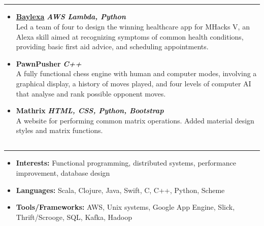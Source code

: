 \documentclass[7pt,letterpaper]{article}
\begin{document}
\subsection*{}
\hrule
\vspace{1.0em}
  \begin{itemize}
    \parskip=-0.5em
  \itemsep0.6em

    \item[]
      {\href{http://devpost.com/software/baylexa-fv149r}{\textbf{Baylexa}}}
      \hfill \textbf{\emph{AWS Lambda, Python}}
      \\
      Led a team of four to design the winning healthcare app for MHacks V, an
      Alexa skill aimed at recognizing symptoms of common health conditions,
      providing basic first aid advice, and scheduling appointments.
    \item[]
      \textbf{PawnPusher} \hfill \textbf{\emph{C++}}
      \\
      A fully functional chess engine with human and computer modes, involving a
      graphical display, a history of moves played, and four levels of computer
      AI that analyse and rank possible opponent moves.
    \item[]
      \textbf{Mathrix} \hfill \textbf{\emph{HTML, CSS, Python, Bootstrap}}
      \\
      A website for performing common matrix operations. Added material design
      styles and matrix functions.
  \end{itemize}

 
\subsection*{}
\hrule
\vspace{1.0em}
  \begin{itemize}
    \parskip=-0.5em
  \itemsep0.5em

    \item[]
      \textbf{Interests:} Functional programming, distributed systems,
      performance improvement, database design
    \item[]
      \textbf{Languages:} Scala, Clojure, Java, Swift, C, C++, Python, Scheme
    \item[]
      \textbf{Tools/Frameworks:} AWS, Unix systems, Google App Engine, Slick,
      Thrift/Scrooge, SQL, Kafka, Hadoop
  \end{itemize}
\end{document}
